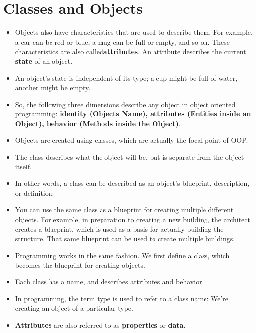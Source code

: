 \documentclass[12pt , a4paper]{article}
\begin{document}
\section{Classes and Objects}
	\begin{itemize}
		\item Objects also have characteristics that are used to describe them. For example, a car can be red or blue, a mug can be full or empty, and so on. These characteristics are also called\textbf{attributes}. An attribute describes the current \textbf{state} of an object.\\
		\item An object's state is independent of its type; a cup might be full of water, another might be empty.\\
		\item So, the following three dimensions describe any object in object oriented programming: \textbf{identity (Objects Name), attributes (Entities inside an Object), behavior (Methods inside the Object)}.\\
		\item Objects are created using classes, which are actually the focal point of OOP.\\
		\item The class describes what the object will be, but is separate from the object itself.\\
		\item In other words, a class can be described as an object's blueprint, description, or definition.\\
		\item You can use the same class as a blueprint for creating multiple different objects. For example, in preparation to creating a new building, the architect creates a blueprint, which is used as a basis for actually building the structure. That same blueprint can be used to create multiple buildings.\\
		\item Programming works in the same fashion. We first define a class, which becomes the blueprint for creating objects.\\
		\item Each class has a name, and describes attributes and behavior.\\
		\item In programming, the term type is used to refer to a class name: We're creating an object of a particular type.\\
		\item \textbf{Attributes} are also referred to as \textbf{properties} or \textbf{data}.\\

\end{itemize}
\end{document}
